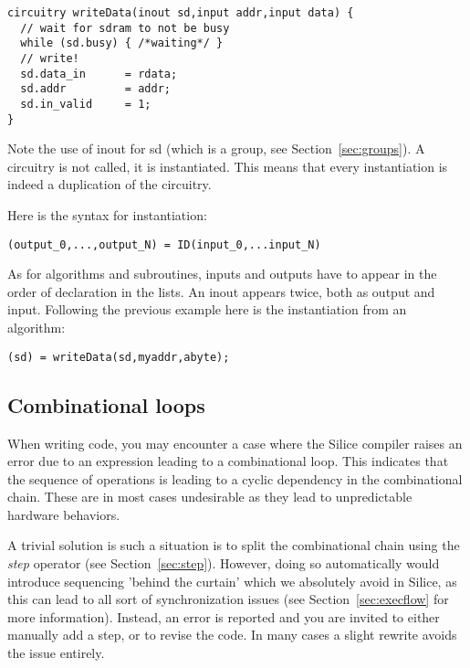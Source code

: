 \documentclass[a4]{article}
\newcommand\silice{Silice}
\begin{document}
\begin{verbatim}
circuitry writeData(inout sd,input addr,input data) {
  // wait for sdram to not be busy
  while (sd.busy) { /*waiting*/ }
  // write!
  sd.data_in      = rdata;
  sd.addr         = addr;
  sd.in_valid     = 1;
}
\end{verbatim}

Note the use of inout for sd (which is a group, see Section~\ref{sec:groups}). 
A circuitry is not called, it is instantiated. This means that
every instantiation is indeed a duplication of the circuitry.

Here is the syntax for instantiation:

\begin{verbatim}
(output_0,...,output_N) = ID(input_0,...input_N)
\end{verbatim}
As for algorithms and subroutines, inputs and outputs have to appear
in the order of declaration in the lists. An inout appears twice, both as output and input. Following the previous example here is the instantiation from an algorithm:

\begin{verbatim}
(sd) = writeData(sd,myaddr,abyte);
\end{verbatim}

\vspace*{5mm}
\noindent
{}


\subsection{Combinational loops}

When writing code, you may encounter a case where the \silice{} compiler
raises an error due to an expression leading to a combinational loop. This
indicates that the sequence of operations is leading to a cyclic dependency
in the combinational chain. These are in most
cases undesirable as they lead to unpredictable hardware behaviors.

A trivial solution is such a situation is to split the combinational chain
using the \textit{step} operator (see Section~\ref{sec:step}). However,
doing so automatically would introduce sequencing 'behind the curtain'
which we absolutely avoid in \silice{}, as this can lead to all sort of synchronization issues (see Section~\ref{sec:execflow} for more information). 
Instead, an error is reported and you are invited to either manually add
a step, or to revise the code. In many cases a slight rewrite avoids the
issue entirely.
\end{document}
